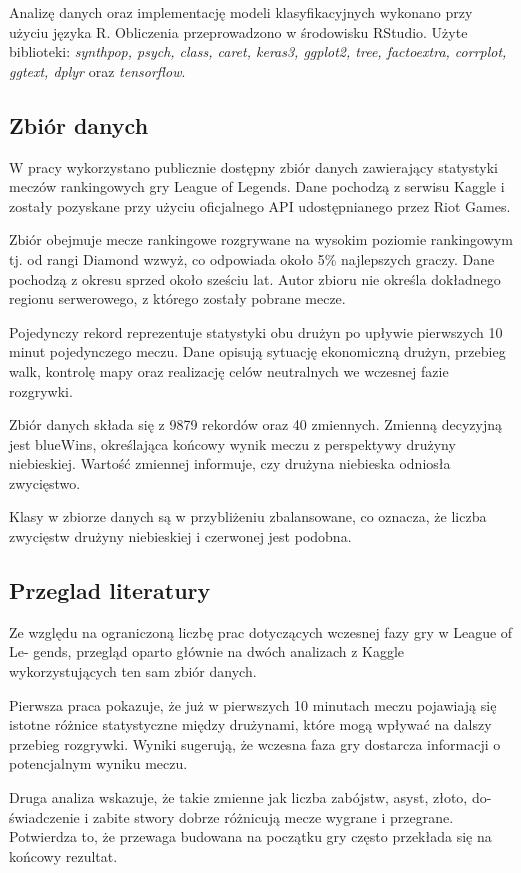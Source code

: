 \documentclass[twoside]{customStyle}
\begin{document}
Analizę danych oraz implementację modeli klasyfikacyjnych wykonano przy użyciu języka R. Obliczenia przeprowadzono w środowisku RStudio. Użyte biblioteki: \textit{synthpop, psych, class, caret, keras3, ggplot2, tree, factoextra, corrplot, ggtext, dplyr} oraz \textit{tensorflow}.
\newpage
\subsection{Zbiór danych}
W pracy wykorzystano publicznie dostępny zbiór danych \cite{Source Data} zawierający statystyki meczów rankingowych gry League of Legends. Dane pochodzą z serwisu Kaggle i zostały pozyskane przy użyciu oficjalnego API udostępnianego przez Riot Games.

Zbiór \cite{Source Data} obejmuje mecze rankingowe rozgrywane na wysokim poziomie rankingowym tj. od rangi Diamond wzwyż, co odpowiada około 5\% najlepszych graczy. Dane pochodzą z okresu sprzed około sześciu lat. Autor zbioru nie określa dokładnego regionu serwerowego, z którego zostały pobrane mecze.

Pojedynczy rekord reprezentuje statystyki obu drużyn po upływie pierwszych 10 minut pojedynczego meczu. Dane opisują sytuację ekonomiczną drużyn, przebieg walk, kontrolę mapy oraz realizację celów neutralnych we wczesnej fazie rozgrywki.

Zbiór danych \cite{Source Data} składa się z 9879 rekordów oraz 40 zmiennych. Zmienną decyzyjną jest blueWins, określająca końcowy wynik meczu z perspektywy drużyny niebieskiej. Wartość zmiennej informuje, czy drużyna niebieska odniosła zwycięstwo.

Klasy w zbiorze danych są w przybliżeniu zbalansowane, co oznacza, że liczba zwycięstw drużyny niebieskiej i czerwonej jest podobna.

\subsection{Przeglad literatury}
Ze względu na ograniczoną liczbę prac dotyczących wczesnej fazy gry w League of Le-
gends, przegląd oparto głównie na dwóch analizach z Kaggle wykorzystujących ten sam
zbiór danych. 

Pierwsza praca \cite{gasmi_lol_first10} pokazuje, że już w pierwszych 10 minutach meczu pojawiają się
istotne różnice statystyczne między drużynami, które mogą wpływać na dalszy przebieg
rozgrywki. Wyniki sugerują, że wczesna faza gry dostarcza informacji o potencjalnym
wyniku meczu.

Druga analiza \cite{wang_lol_win} wskazuje, że takie zmienne jak liczba zabójstw, asyst, złoto, do-
świadczenie i zabite stwory dobrze różnicują mecze wygrane i przegrane. Potwierdza to,
że przewaga budowana na początku gry często przekłada się na końcowy rezultat.
\end{document}
